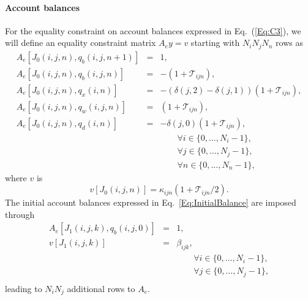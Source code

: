 \documentclass{report}[fleqn,12pt]
\begin{document}
\paragraph*{Account balances}
For the equality constraint on account balances expressed in Eq.~(\ref{Eq:C3}),
we will define an equality constraint matrix $A_ey = v$ starting
with $N_iN_jN_n$ rows as
\begin{eqnarray}
	\label{Eq:B1}
	A_e[J_0(i, j, n), q_b(i, j, n+1)] &=& 1, \nonumber \\
	A_e[J_0(i, j, n), q_b(i, j, n)] &=& -(1 + \mathcal{T}_{ijn}), \nonumber \\
	A_e[J_0(i, j, n), q_x(i, n)] &=& -(\delta(j, 2) - \delta(j, 1))(1 + \mathcal{T}_{ijn}), \nonumber \\
	A_e[J_0(i, j, n), q_w(i, j, n)] &=& (1 + \mathcal{T}_{ijn}), \nonumber \\
	A_e[J_0(i, j, n), q_d(i, n)] &=& -\delta(j, 0)(1 + \mathcal{T}_{ijn}), \\
	&&\qquad\forall i \in \{0,\ldots, N_i-1\},\nonumber\\
	&&\qquad\forall j \in \{0,\ldots, N_j-1\},\nonumber\\
	&&\qquad\forall n \in \{0,\ldots, N_n-1\}, \nonumber
\end{eqnarray}
where $v$ is
\begin{equation}
	v[J_0(i, j, n)] = \kappa_{ijn}(1 + \mathcal{T}_{ijn}/2).
\end{equation}
The initial account balances expressed in Eq.~\ref{Eq:InitialBalance} are imposed through
\begin{eqnarray}
	A_e[J_1(i, j, k), q_b(i, j, 0)] &=& 1, \nonumber \\
	v[J_1(i, j, k)] &=& \beta_{ijk},  \\
	&&\qquad\forall i \in \{0,\ldots, N_i-1\},\nonumber\\
	&&\qquad\forall j \in \{0,\ldots, N_j-1\},\nonumber\\
\end{eqnarray}
leading to $N_i N_j$ additional rows to $A_e$.
\end{document}
